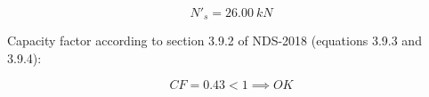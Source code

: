 \begin{equation}
  N'_s= 26.00\ kN
\end{equation}

\noindent Capacity factor according to section 3.9.2 of NDS-2018 (equations 3.9.3 and 3.9.4):

\begin{equation}
  CF= 0.43 < 1 \implies OK
\end{equation}
